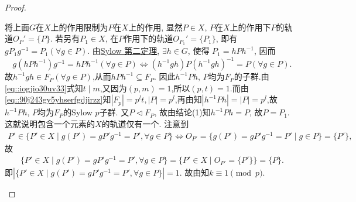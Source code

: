 \documentclass[../../main.tex]{subfiles}%
\begin{document}
\begin{proof}
\begin{enumerate}[(1)]
将上面$G$在$X$上的作用限制为$P$在$X$上的作用, 显然$P\in X$, $P$在$X$上的作用下$P$的轨道$O_P'=\{P\}$. 若另有$P_1\in X$, 在$P$作用下的轨道$O_{P_1}'=\{P_1\}$, 即有$gP_1g^{-1}=P_1(\forall g\in P)$. 由\hyperref[theorem:Sylow 第二定理]{Sylow 第二定理}, $\exists h\in G$, 使得
$P_1=hPh^{-1}$, 因而
$$
g(hPh^{-1})g^{-1}=hPh^{-1}(\forall g\in P) \iff (h^{-1}gh)P(h^{-1}gh)^{-1}=P(\forall g\in P).
$$
故$h^{-1}gh\in F_P(\forall g\in P)$,从而$hPh^{-1}\subseteq F_P$. 因此$h^{-1}Ph$, $P$均为$F_P$的子群.由\eqref{eq::iogjio30uv33}式知$t\mid m$,又因为$(p,m)=1$,所以$(p,t)=1.$而由\eqref{eq::90j243gy5yhserfgdjirzz}知$|F_p|=p^lt,|P|=p^l$,再由知$|h^{-1}Ph|=|P|=p^l$,故$h^{-1}Ph$, $P$均为$F_P$的Sylow $p$子群. 又$P\lhd F_P$, 故由结论(1)知$h^{-1}Ph=P$, 故$P=P_1$. 这就说明包含一个元素的$X$的轨道仅有一个. 注意到
\begin{align*}
P' \in \{ P' \in X \mid g(P') = gP'g^{-1} = P', \forall g \in P \} \iff O_{P'} = \{ g(P') = gP'g^{-1} = P' \mid g \in P \} = \{ P' \},
\end{align*}
故
\begin{align*}
\{ P' \in X \mid g(P') = gP'g^{-1} = P', \forall g \in P \} = \{ P' \in X \mid O_{P'} = \{ P' \} \} = \{ P \}.
\end{align*}
即$| \{ P' \in X \mid g(P') = gP'g^{-1} = P', \forall g \in P \} | = 1.$
故由知$k\equiv 1\pmod{p}$.
\end{enumerate}

\end{proof}
\end{document}
